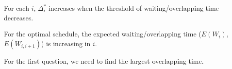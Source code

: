 \documentclass{article}
\newcommand{\Z}{\mathbf{Z}}
\newcommand{\D}{\bm{\Delta}}
\begin{document}
For each $i$, $\Delta_{i}^{*}$ increases when the threshold of waiting/overlapping time decreases.

For the optimal schedule, the expected waiting/overlapping time ($E(W_{i})$, $E(W_{i,i+1})$) is increasing in $i$.


For the first question, we need to find the largest overlapping time.








\end{document}

